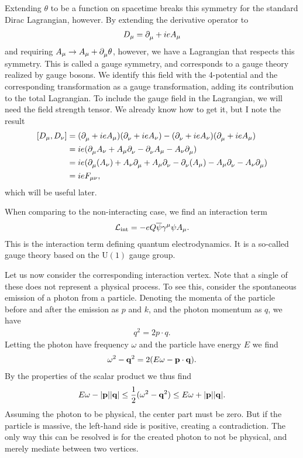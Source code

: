 Extending $\theta$ to be a function on spacetime breaks this symmetry for the standard Dirac Lagrangian, however. By extending the derivative operator to
\begin{align*}
	D_{\mu} = \partial^{}_{\mu} + ieA_{\mu}
\end{align*}
and requiring $A_{\mu}\to A_{\mu} + \partial^{}_{\mu}\theta$, however, we have a Lagrangian that respects this symmetry. This is called a gauge symmetry, and corresponds to a gauge theory realized by gauge bosons. We identify this field with the 4-potential and the corresponding transformation as a gauge transformation, adding its contribution to the total Lagrangian. To include the gauge field in the Lagrangian, we will need the field strength tensor. We already know how to get it, but I note the result
\begin{align*}
	\comm{D_{\mu}}{D_{\nu}} &= (\del{}{\mu} + ieA_{\mu})(\del{}{\nu} + ieA_{\nu}) - (\del{}{\nu} + ieA_{\nu})(\del{}{\mu} + ieA_{\mu}) \\
	                        &= ie(\del{}{\mu}A_{\nu} + A_{\mu}\del{}{\nu} - \del{}{\nu}A_{\mu} - A_{\nu}\del{}{\mu})  \\
	                        &= ie(\del{}{\mu}(A_{\nu}) + A_{\nu}\del{}{\mu} + A_{\mu}\del{}{\nu} - \del{}{\nu}(A_{\mu}) - A_{\mu}\del{}{\nu} - A_{\nu}\del{}{\mu}) \\
	                        &= ieF_{\mu\nu},
\end{align*}
which will be useful later.

When comparing to the non-interacting case, we find an interaction term
\begin{align*}
	\mathcal{L}_{\text{int}} = -eQ\overline{\psi}\gamma^{\mu}\psi A_{\mu}.
\end{align*}
This is the interaction term defining quantum electrodynamics. It is a so-called gauge theory based on the $\text{U}(1)$ gauge group.

Let us now consider the corresponding interaction vertex. Note that a single of these does not represent a physical process. To see this, consider the spontaneous emission of a photon from a particle. Denoting the momenta of the particle before and after the emission as $p$ and $k$, and the photon momentum as $q$, we have
\begin{align*}
	q^{2} = 2p\cdot q.
\end{align*}
Letting the photon have frequency $\omega$ and the particle have energy $E$ we find
\begin{align*}
	\omega^{2} - \vb{q}^{2} = 2(E\omega - \vb{p}\cdot\vb{q}).
\end{align*}
By the properties of the scalar product we thus find
\begin{align*}
	E\omega - \abs{\vb{p}}\abs{\vb{q}} \leq \frac{1}{2}(\omega^{2} - \vb{q}^{2}) \leq E\omega + \abs{\vb{p}}\abs{\vb{q}}.
\end{align*}
Assuming the photon to be physical, the center part must be zero. But if the particle is massive, the left-hand side is positive, creating a contradiction. The only way this can be resolved is for the created photon to not be physical, and merely mediate between two vertices.

